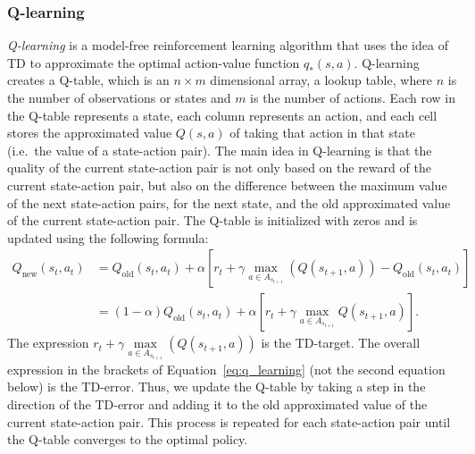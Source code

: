 \subsubsection*{Q-learning}
\emph{Q-learning} is a model-free reinforcement learning algorithm that uses the idea of TD to approximate the optimal action-value function $q_*(s,a)$.
Q-learning creates a Q-table, which is an $n\times m$ dimensional array, a lookup table, where $n$ is the number of observations or states and $m$ is the number of actions.
Each row in the Q-table represents a state, each column represents an action, and each cell stores the approximated value $Q(s,a)$ of taking that action in that state (i.e.\ the value of a state-action pair).
The main idea in Q-learning is that the quality of the current state-action pair is not only based on the reward of the current state-action pair, but also on the difference between the maximum value of the next state-action pairs, for the next state, and the old approximated value of the current state-action pair.
The Q-table is initialized with zeros and is updated using the following formula:
\begin{align}
    Q_{\text{new}}(s_t,a_t) &= Q_{\text{old}}(s_t,a_t) + \alpha\left[r_{t} + \gamma \max_{a\in A_{s_{t+1}}}(Q(s_{t+1},a)) - Q_{\text{old}}(s_t,a_t)\right] \label{eq:q_learning} \\
                            &= (1-\alpha)Q_{\text{old}}(s_t,a_t) + \alpha\left[r_{t} + \gamma \max_{a\in A_{s_{t+1}}}Q(s_{t+1},a)\right] \nonumber.
\end{align}
The expression $r_{t} + \gamma \underset{a\in A_{s_{t+1}}}{\max}(Q(s_{t+1},a))$ is the TD-target.
The overall expression in the brackets of Equation\ \ref{eq:q_learning} (not the second equation below) is the TD-error.
Thus, we update the Q-table by taking a step in the direction of the TD-error and adding it to the old approximated value of the current state-action pair.
This process is repeated for each state-action pair until the Q-table converges to the optimal policy.

